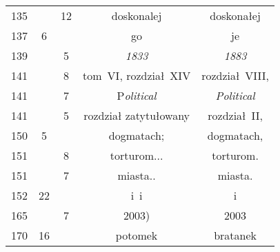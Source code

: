 \documentclass[a4paper,11pt]{article}
\begin{document}
\begin{center}
\begin{tabular}{|c|c|c|c|c|}
    135 & & 12 & doskonalej & doskonałej \\
    137 &  6 & & go & je \\
    139 & &  5 & \emph{1833} & \emph{1883} \\
    141 & &  8 & tom~VI, rozdział~XIV & rozdział~VIII, \\
    141 & &  7 & P\emph{olitical} & \emph{Political} \\
    141 & &  5 & rozdział zatytułowany & rozdział~II, \\
    150 &  5 & & dogmatach; & dogmatach, \\
    151 & &  8 & torturom... & torturom. \\
    151 & &  7 & miasta.. & miasta. \\
    152 & 22 & & i~i & i \\
    165 & &  7 & 2003) & 2003 \\
    170 & 16 & & potomek & bratanek \\
    \hline
  \end{tabular}


\end{center}
\end{document}
